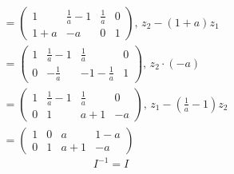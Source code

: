 \documentclass{standalone}
\begin{document}
\begin{enumerate}[a)]
\begin{align}
        &= \left( \begin{array}{cc|cc}
            1 & \frac{1}{a}-1 & \frac{1}{a} & 0 \\
            1+a & -a & 0 & 1
        \end{array} \right) \text{, } z_2 - (1+a)z_1 \\
        &= \left( \begin{array}{cc|cc}
            1 & \frac{1}{a}-1 & \frac{1}{a} & 0 \\
            0 & -\frac{1}{a} & -1 - \frac{1}{a} & 1
        \end{array} \right) \text{, } z_2\cdot(-a) \\
        &= \left( \begin{array}{cc|cc}
            1 & \frac{1}{a}-1 & \frac{1}{a} & 0 \\
            0 & 1 & a + 1 & -a
        \end{array} \right) \text{, } z_1-(\frac{1}{a}-1)z_2 \\
        &= \left( \begin{array}{cc|cc}
            1 & 0 & a & 1-a \\
            0 & 1 & a +1 & -a
        \end{array} \right) 
    \end{align}
    $$I^{-1}=I$$
\end{enumerate}
\end{document}
